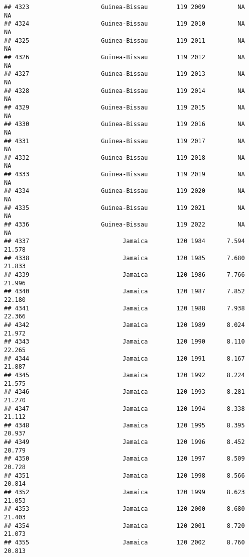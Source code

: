 \documentclass[
]{article}
\begin{document}
\begin{verbatim}
## 4323                    Guinea-Bissau        119 2009         NA         NA
## 4324                    Guinea-Bissau        119 2010         NA         NA
## 4325                    Guinea-Bissau        119 2011         NA         NA
## 4326                    Guinea-Bissau        119 2012         NA         NA
## 4327                    Guinea-Bissau        119 2013         NA         NA
## 4328                    Guinea-Bissau        119 2014         NA         NA
## 4329                    Guinea-Bissau        119 2015         NA         NA
## 4330                    Guinea-Bissau        119 2016         NA         NA
## 4331                    Guinea-Bissau        119 2017         NA         NA
## 4332                    Guinea-Bissau        119 2018         NA         NA
## 4333                    Guinea-Bissau        119 2019         NA         NA
## 4334                    Guinea-Bissau        119 2020         NA         NA
## 4335                    Guinea-Bissau        119 2021         NA         NA
## 4336                    Guinea-Bissau        119 2022         NA         NA
## 4337                          Jamaica        120 1984      7.594     21.578
## 4338                          Jamaica        120 1985      7.680     21.833
## 4339                          Jamaica        120 1986      7.766     21.996
## 4340                          Jamaica        120 1987      7.852     22.180
## 4341                          Jamaica        120 1988      7.938     22.366
## 4342                          Jamaica        120 1989      8.024     21.972
## 4343                          Jamaica        120 1990      8.110     22.265
## 4344                          Jamaica        120 1991      8.167     21.887
## 4345                          Jamaica        120 1992      8.224     21.575
## 4346                          Jamaica        120 1993      8.281     21.270
## 4347                          Jamaica        120 1994      8.338     21.112
## 4348                          Jamaica        120 1995      8.395     20.937
## 4349                          Jamaica        120 1996      8.452     20.779
## 4350                          Jamaica        120 1997      8.509     20.728
## 4351                          Jamaica        120 1998      8.566     20.814
## 4352                          Jamaica        120 1999      8.623     21.053
## 4353                          Jamaica        120 2000      8.680     21.403
## 4354                          Jamaica        120 2001      8.720     21.073
## 4355                          Jamaica        120 2002      8.760     20.813

\end{verbatim}
\end{document}
